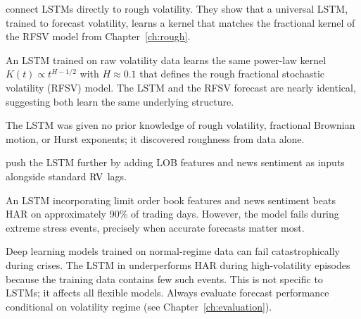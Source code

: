 \citet{RosenbaumZhang2022} connect LSTMs directly to rough volatility.
They show that a universal LSTM, trained to forecast volatility, learns a kernel that matches the fractional kernel of the RFSV model from Chapter~\ref{ch:rough}.

\begin{keyresult}
An LSTM trained on raw volatility data learns the same power-law kernel $K(t) \propto t^{H-1/2}$ with $H \approx 0.1$ that defines the rough fractional stochastic volatility (RFSV) model.
The LSTM and the RFSV forecast are nearly identical, suggesting both learn the same underlying structure.
\end{keyresult}

The LSTM was given no prior knowledge of rough volatility, fractional Brownian motion, or Hurst exponents; it discovered roughness from data alone.

\citet{RahimikiaPoon2020} push the LSTM further by adding LOB features and news sentiment as inputs alongside standard $\operatorname{RV}$ lags.

\begin{keyresult}
An LSTM incorporating limit order book features and news sentiment beats HAR on approximately 90\% of trading days.
However, the model fails during extreme stress events, precisely when accurate forecasts matter most.
\end{keyresult}

\begin{warning}
Deep learning models trained on normal-regime data can fail catastrophically during crises.
The LSTM in \citet{RahimikiaPoon2020} underperforms HAR during high-volatility episodes because the training data contains few such events.
This is not specific to LSTMs; it affects all flexible models.
Always evaluate forecast performance conditional on volatility regime (see Chapter~\ref{ch:evaluation}).
\end{warning}

